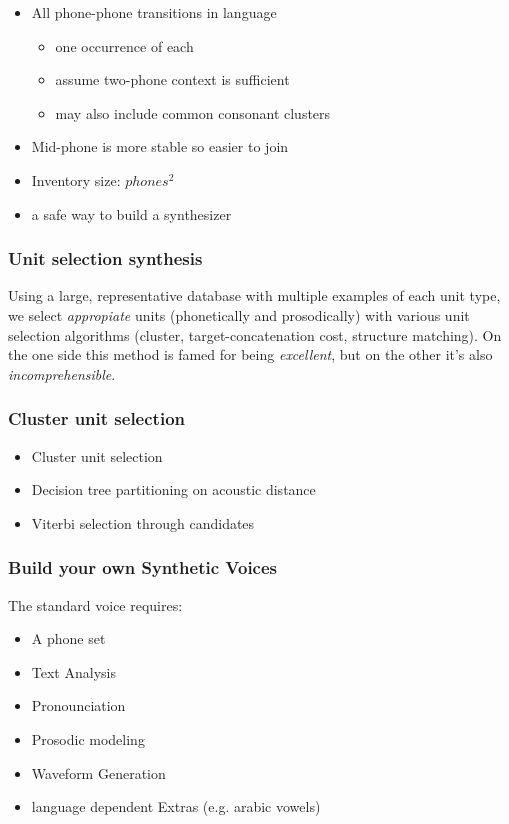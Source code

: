 \begin{itemize}
\item All phone-phone transitions in language
\begin{itemize}
\item one occurrence of each
\item assume two-phone context is sufficient
\item may also include common consonant clusters
\end{itemize}
\item Mid-phone is more stable so easier to join
\item Inventory size: $phones^2$
\item a safe way to build a synthesizer
\end{itemize}

\subsubsection{Unit selection synthesis}
Using a large, representative database with multiple examples of each unit type, we select \emph{appropiate} units (phonetically and prosodically) with various unit selection algorithms (cluster, target-concatenation cost, structure matching). On the one side this method is famed for being \emph{excellent}, but on the other it's also \emph{incomprehensible}. 

\subsubsection{Cluster unit selection}
\begin{itemize}
\item Cluster unit selection
\item Decision tree partitioning on acoustic distance
\item Viterbi selection through candidates
\end{itemize}

\subsubsection{Build your own Synthetic Voices}
The standard voice requires:
\begin{itemize}
\item A phone set
\item Text Analysis
\item Pronounciation
\item Prosodic modeling
\item Waveform Generation
\item language dependent Extras (e.g. arabic vowels)
\end{itemize}

